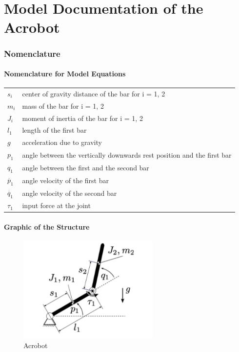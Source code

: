 \documentclass[10pt,a4paper]{article}
\begin{document}
	\part*{Model Documentation of the \\ Acrobot} %
	
	
	\section{Nomenclature} %
	\subsection{Nomenclature for Model Equations} %
	
	\begin{tabular}{ll}
		$s_i$ & center of gravity distance of the bar for i = 1, 2 \\
		$m_i$ & mass of the bar for i = 1, 2 \\
		$J_i$ & moment of inertia of the bar for i = 1, 2 \\
		$l_1$ & length of the first bar \\
		$g$ & acceleration due to gravity \\
		$p_1$ & angle between the vertically downwards rest position and the first bar \\
		$q_1$ & angle between the first and the second bar \\
		$\dot{p_1}$ & angle velocity of the first bar \\
		$\dot{q_1}$ & angle velocity of the second bar \\
		$\tau_1$ & input force at the joint \\
				
	\end{tabular}
	
	\subsection{Graphic of the Structure}	
	\begin{figure}[H]
		\centering
		\includegraphics[width=70mm]{acrobot.pdf}
		\caption{Acrobot}
	\end{figure}
	 
\end{document}
